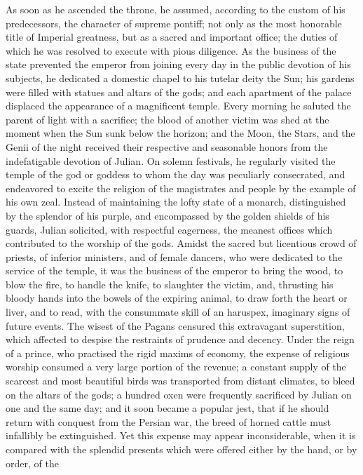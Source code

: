 As soon as he ascended the throne, he assumed, according to the
custom of his predecessors, the character of supreme pontiff; not
only as the most honorable title of Imperial greatness, but as a
sacred and important office; the duties of which he was resolved
to execute with pious diligence. As the business of the state
prevented the emperor from joining every day in the public
devotion of his subjects, he dedicated a domestic chapel to his
tutelar deity the Sun; his gardens were filled with statues and
altars of the gods; and each apartment of the palace displaced
the appearance of a magnificent temple. Every morning he saluted
the parent of light with a sacrifice; the blood of another victim
was shed at the moment when the Sun sunk below the horizon; and
the Moon, the Stars, and the Genii of the night received their
respective and seasonable honors from the indefatigable devotion
of Julian. On solemn festivals, he regularly visited the temple
of the god or goddess to whom the day was peculiarly consecrated,
and endeavored to excite the religion of the magistrates and
people by the example of his own zeal. Instead of maintaining the
lofty state of a monarch, distinguished by the splendor of his
purple, and encompassed by the golden shields of his guards,
Julian solicited, with respectful eagerness, the meanest offices
which contributed to the worship of the gods. Amidst the sacred
but licentious crowd of priests, of inferior ministers, and of
female dancers, who were dedicated to the service of the temple,
it was the business of the emperor to bring the wood, to blow the
fire, to handle the knife, to slaughter the victim, and,
thrusting his bloody hands into the bowels of the expiring
animal, to draw forth the heart or liver, and to read, with the
consummate skill of an haruspex, imaginary signs of future
events. The wisest of the Pagans censured this extravagant
superstition, which affected to despise the restraints of
prudence and decency. Under the reign of a prince, who practised
the rigid maxims of economy, the expense of religious worship
consumed a very large portion of the revenue; a constant supply
of the scarcest and most beautiful birds was transported from
distant climates, to bleed on the altars of the gods; a hundred
oxen were frequently sacrificed by Julian on one and the same
day; and it soon became a popular jest, that if he should return
with conquest from the Persian war, the breed of horned cattle
must infallibly be extinguished. Yet this expense may appear
inconsiderable, when it is compared with the splendid presents
which were offered either by the hand, or by order, of the
